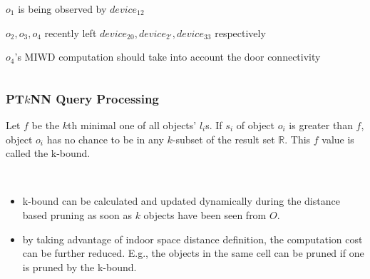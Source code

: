 \begin{frame}
\begin{columns}[c]
\begin{fitemize}
  \item ${o_1}$ is being observed by ${device_{12}}$
  \item ${o_2, o_3, o_4}$ recently left ${device_{20}, device_{2'}, device_{33}}$ respectively
  \item ${o_4}$'s MIWD computation should take into account the door connectivity
\end{fitemize}

\end{columns}

\end{frame}


\begin{frame}
\frametitle{PT$k$NN Query Processing}

\begin{definition}[k-bound]
  \textrm{Let ${f}$ be the ${k}$th minimal one of all objects' ${l_i}$s. If ${s_i}$ of object ${o_i}$ is greater than ${f}$, object ${o_i}$ has no chance to be in any ${k}$-subset of the result set $\mathbb{R}$. This ${f}$ value is called the k-bound.~\cite{cheng2009evaluating}}
\end{definition}

~\\
\begin{itemize}
  \item k-bound can be calculated and updated dynamically during the distance based pruning as soon as $k$ objects have been seen from ${O}$.
  \item by taking advantage of indoor space distance definition, the computation cost can be further reduced. E.g., the objects in the same cell can be pruned if one is pruned by the k-bound.
\end{itemize}

\end{frame}


